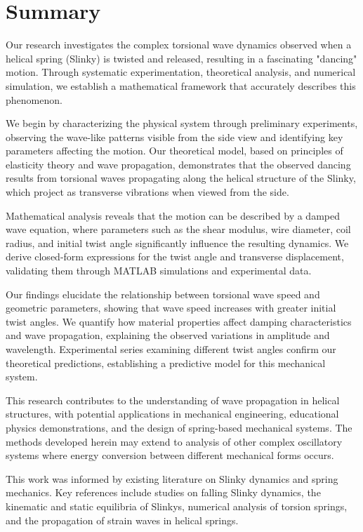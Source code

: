 \documentclass{mcmthesis}  %
\begin{document}
\section{Summary}  %

Our research investigates the complex torsional wave dynamics observed when a helical spring (Slinky) is twisted and released, resulting in a fascinating "dancing" motion. Through systematic experimentation, theoretical analysis, and numerical simulation, we establish a mathematical framework that accurately describes this phenomenon. 

We begin by characterizing the physical system through preliminary experiments, observing the wave-like patterns visible from the side view and identifying key parameters affecting the motion. Our theoretical model, based on principles of elasticity theory and wave propagation, demonstrates that the observed dancing results from torsional waves propagating along the helical structure of the Slinky, which project as transverse vibrations when viewed from the side.

Mathematical analysis reveals that the motion can be described by a damped wave equation, where parameters such as the shear modulus, wire diameter, coil radius, and initial twist angle significantly influence the resulting dynamics. We derive closed-form expressions for the twist angle and transverse displacement, validating them through MATLAB simulations and experimental data.

Our findings elucidate the relationship between torsional wave speed and geometric parameters, showing that wave speed increases with greater initial twist angles. We quantify how material properties affect damping characteristics and wave propagation, explaining the observed variations in amplitude and wavelength. Experimental series examining different twist angles confirm our theoretical predictions, establishing a predictive model for this mechanical system.

This research contributes to the understanding of wave propagation in helical structures, with potential applications in mechanical engineering, educational physics demonstrations, and the design of spring-based mechanical systems. The methods developed herein may extend to analysis of other complex oscillatory systems where energy conversion between different mechanical forms occurs.

This work was informed by existing literature on Slinky dynamics and spring mechanics. Key references include studies on falling Slinky dynamics\cite{falling-slinky}, the kinematic and static equilibria of Slinkys\cite{kinematics-slinky}, numerical analysis of torsion springs\cite{torsion-springs}, and the propagation of strain waves in helical springs\cite{strain-waves-numerical, strain-waves-cylindrical}.
\end{document}
